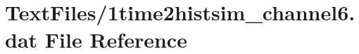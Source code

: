 \hypertarget{1time2histsim__channel6_8dat}{}\section{Text\+Files/1time2histsim\+\_\+channel6.dat File Reference}
\label{1time2histsim__channel6_8dat}
